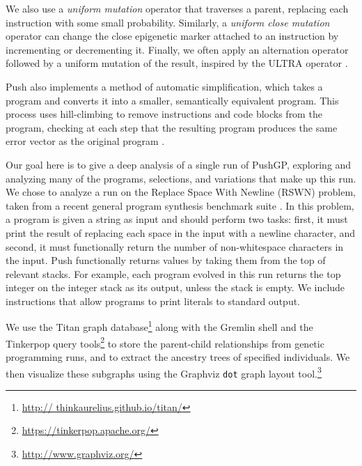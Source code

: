 
We also use a \textit{uniform mutation} operator that traverses a parent, 
replacing each instruction with some small probability. Similarly, a 
\textit{uniform close mutation} operator can change the close epigenetic marker 
attached to an instruction by incrementing or decrementing it. Finally, we 
often apply an alternation operator followed by a uniform mutation of the 
result, inspired by the ULTRA operator \citep{Spector:2013:GPTP}.

Push also implements a method of automatic simplification, which takes a program and 
converts it into a smaller, semantically equivalent program. This process uses 
hill-climbing to remove instructions and code blocks from the program, checking 
at each step that the resulting program produces the same error vector as the 
original program \citep{Spector:2014:GECCOcomp}.

Our goal here is to give a deep analysis of a single run of PushGP, exploring and analyzing many of the programs, selections, and variations that make up this run. We chose to analyze a run on the Replace Space With Newline (RSWN) problem, taken from a recent general program synthesis benchmark suite \citep{Helmuth:2015:GECCO}. In this problem, a program is given a string as input and should perform two tasks: first, it must print the result of replacing each space in the input with a newline character, and second, it must functionally return the number of non-whitespace characters in the input. Push functionally returns values by taking them from the top of relevant stacks. For example, each program evolved in this run returns the top integer on the integer stack as its output, unless the stack is empty. We include instructions that allow programs to print literals to standard output.

We use the Titan graph database\footnote{\url{http://
thinkaurelius.github.io/titan/}} along with the Gremlin shell and the Tinkerpop query 
tools\footnote{\url{https://tinkerpop.apache.org/}} to store the parent-child 
relationships from genetic programming runs, and to extract the ancestry trees of 
specified individuals. We then visualize these subgraphs using the Graphviz \texttt{dot} 
graph layout tool.\footnote{\url{http://www.graphviz.org/}}

